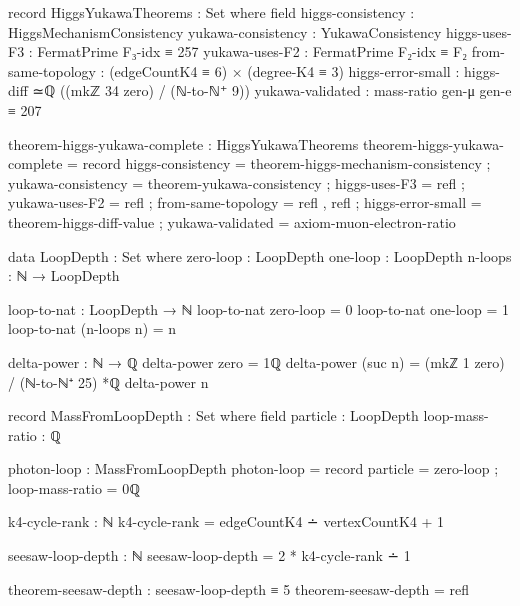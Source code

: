 \documentclass[11pt,a4paper]{book}
\begin{document}
\begin{code}
record HiggsYukawaTheorems : Set where
  field
    higgs-consistency : HiggsMechanismConsistency
    yukawa-consistency : YukawaConsistency
    higgs-uses-F3 : FermatPrime F₃-idx ≡ 257
    yukawa-uses-F2 : FermatPrime F₂-idx ≡ F₂
    from-same-topology : (edgeCountK4 ≡ 6) × (degree-K4 ≡ 3)
    higgs-error-small : higgs-diff ≃ℚ ((mkℤ 34 zero) / (ℕ-to-ℕ⁺ 9))
    yukawa-validated : mass-ratio gen-μ gen-e ≡ 207

theorem-higgs-yukawa-complete : HiggsYukawaTheorems
theorem-higgs-yukawa-complete = record
  { higgs-consistency = theorem-higgs-mechanism-consistency
  ; yukawa-consistency = theorem-yukawa-consistency
  ; higgs-uses-F3 = refl
  ; yukawa-uses-F2 = refl
  ; from-same-topology = refl , refl
  ; higgs-error-small = theorem-higgs-diff-value
  ; yukawa-validated = axiom-muon-electron-ratio
  }
\end{code}

\begin{code}
data LoopDepth : Set where
  zero-loop : LoopDepth
  one-loop  : LoopDepth
  n-loops   : ℕ → LoopDepth

loop-to-nat : LoopDepth → ℕ
loop-to-nat zero-loop = 0
loop-to-nat one-loop = 1
loop-to-nat (n-loops n) = n
\end{code}

\begin{code}
delta-power : ℕ → ℚ
delta-power zero = 1ℚ
delta-power (suc n) = (mkℤ 1 zero) / (ℕ-to-ℕ⁺ 25) *ℚ delta-power n

record MassFromLoopDepth : Set where
  field
    particle : LoopDepth
    loop-mass-ratio : ℚ
\end{code}

\begin{code}
photon-loop : MassFromLoopDepth
photon-loop = record { particle = zero-loop ; loop-mass-ratio = 0ℚ }
\end{code}

\begin{code}
k4-cycle-rank : ℕ
k4-cycle-rank = edgeCountK4 ∸ vertexCountK4 + 1
\end{code}

\begin{code}
seesaw-loop-depth : ℕ
seesaw-loop-depth = 2 * k4-cycle-rank ∸ 1

theorem-seesaw-depth : seesaw-loop-depth ≡ 5
theorem-seesaw-depth = refl
\end{code}
\end{document}
